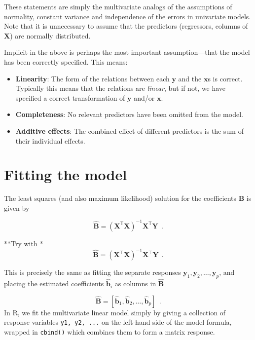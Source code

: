 \documentclass[
  letterpaper,
  10pt,
  krantz2]{krantz}
\begin{document}
{These statements are simply the multivariate analogs of the assumptions
of normality, constant variance and independence of the errors in
univariate models. Note that it is unnecessary to assume that the
predictors (regressors, columns of \(\mathbf{X}\)) are normally
distributed.

Implicit in the above is perhaps the most important assumption---that
the model has been correctly specified. This means:

\begin{itemize}
\item
  \textbf{Linearity}: The form of the relations between each
  \(\mathbf{y}\) and the \(\mathbf{x}\)s is correct. Typically this
  means that the relations are \emph{linear}, but if not, we have
  specified a correct transformation of \(\mathbf{y}\) and/or
  \(\mathbf{x}\).
\item
  \textbf{Completeness}: No relevant predictors have been omitted from
  the model.
\item
  \textbf{Additive effects}: The combined effect of different predictors
  is the sum of their individual effects.
\end{itemize}

\section{Fitting the model}\label{fitting-the-model}

The least squares (and also maximum likelihood) solution for the
coefficients \(\mathbf{B}\) is given by

\[
\widehat{\mathbf{B}} = (\mathbf{X}^\mathsf{T}\mathbf{X})^{-1} \mathbf{X}^\mathsf{T}\mathbf{Y} \:\: .
\]

**Try with \top** \[
\widehat{\mathbf{B}} = (\mathbf{X}^\top \mathbf{X})^{-1} \mathbf{X}^\top \mathbf{Y} \:\: .
\]

This is precisely the same as fitting the separate responses
\(\mathbf{y}_1 , \mathbf{y}_2 , \dots , \mathbf{y}_p\), and placing the
estimated coefficients \(\widehat{\mathbf{b}}_i\) as columns in
\(\widehat{\mathbf{B}}\)

\[
\widehat{\mathbf{B}} = [ \widehat{\mathbf{b}}_1, \widehat{\mathbf{b}}_2, \dots , \widehat{\mathbf{b}}_p] \:\: .
\] In R, we fit the multivariate linear model simply by giving a
collection of response variables \texttt{y1,\ y2,\ ...} on the left-hand
side of the model formula, wrapped in \texttt{cbind()} which combines
them to form a matrix response.

}
\end{document}

